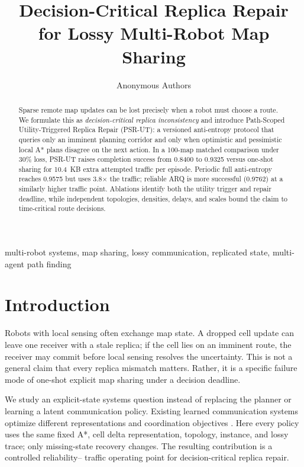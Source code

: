 \documentclass[conference]{IEEEtran}
\title{Decision-Critical Replica Repair for Lossy Multi-Robot Map Sharing}
\author{Anonymous Authors}
\begin{document}
\maketitle

\begin{abstract}
Sparse remote map updates can be lost precisely when a robot must choose a
route. We formulate this as \emph{decision-critical replica inconsistency} and
introduce Path-Scoped Utility-Triggered Replica Repair (PSR-UT): a versioned
anti-entropy protocol that queries only an imminent planning corridor and only
when optimistic and pessimistic local A* plans disagree on the next action. In
a 100-map matched comparison under 30\% loss, PSR-UT raises completion
success from 0.8400 to 0.9325 versus one-shot sharing for 10.4~KB extra
attempted traffic per episode. Periodic full anti-entropy reaches 0.9575 but
uses 3.8$\times$ the traffic; reliable ARQ is more successful (0.9762) at a
similarly higher traffic point. Ablations identify both the utility trigger and
repair deadline, while independent topologies, densities, delays, and scales
bound the claim to time-critical route decisions.
\end{abstract}

\begin{IEEEkeywords}
multi-robot systems, map sharing, lossy communication, replicated state,
multi-agent path finding
\end{IEEEkeywords}

\section{Introduction}
Robots with local sensing often exchange map state. A dropped cell update can
leave one receiver with a stale replica; if the cell lies on an imminent route,
the receiver may commit before local sensing resolves the uncertainty. This is
not a general claim that every replica mismatch matters. Rather, it is a
specific failure mode of one-shot explicit map sharing under a decision
deadline.

We study an explicit-state systems question instead of replacing the planner or
learning a latent communication policy. Existing learned communication systems
optimize different representations and coordination objectives
\cite{ma2021dcc,wang2023scrimp}. Here every policy uses the same fixed A*, cell
delta representation, topology, instance, and lossy trace; only missing-state
recovery changes. The resulting contribution is a controlled reliability--
traffic operating point for decision-critical replica repair.
\end{document}
